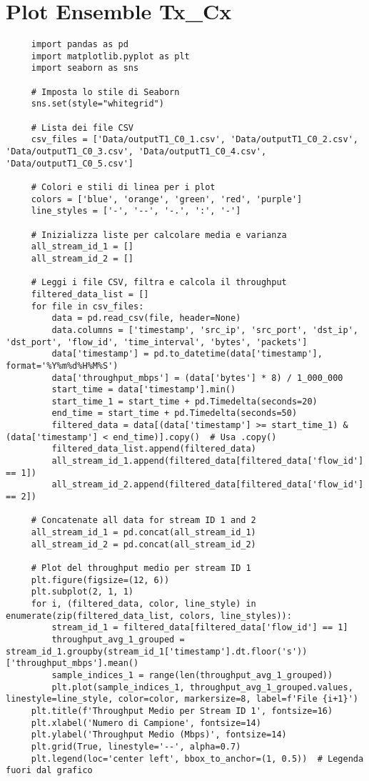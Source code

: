 \section{Plot Ensemble Tx\_Cx}
\label{plot_test_spaghetti}
\begin{lstlisting}
     import pandas as pd
     import matplotlib.pyplot as plt
     import seaborn as sns
     
     # Imposta lo stile di Seaborn
     sns.set(style="whitegrid")
     
     # Lista dei file CSV
     csv_files = ['Data/outputT1_C0_1.csv', 'Data/outputT1_C0_2.csv', 'Data/outputT1_C0_3.csv', 'Data/outputT1_C0_4.csv', 'Data/outputT1_C0_5.csv']
     
     # Colori e stili di linea per i plot
     colors = ['blue', 'orange', 'green', 'red', 'purple']
     line_styles = ['-', '--', '-.', ':', '-']
     
     # Inizializza liste per calcolare media e varianza
     all_stream_id_1 = []
     all_stream_id_2 = []
     
     # Leggi i file CSV, filtra e calcola il throughput
     filtered_data_list = []
     for file in csv_files:
         data = pd.read_csv(file, header=None)
         data.columns = ['timestamp', 'src_ip', 'src_port', 'dst_ip', 'dst_port', 'flow_id', 'time_interval', 'bytes', 'packets']
         data['timestamp'] = pd.to_datetime(data['timestamp'], format='%Y%m%d%H%M%S')
         data['throughput_mbps'] = (data['bytes'] * 8) / 1_000_000
         start_time = data['timestamp'].min()
         start_time_1 = start_time + pd.Timedelta(seconds=20)
         end_time = start_time + pd.Timedelta(seconds=50)
         filtered_data = data[(data['timestamp'] >= start_time_1) & (data['timestamp'] < end_time)].copy()  # Usa .copy()
         filtered_data_list.append(filtered_data)
         all_stream_id_1.append(filtered_data[filtered_data['flow_id'] == 1])
         all_stream_id_2.append(filtered_data[filtered_data['flow_id'] == 2])
     
     # Concatenate all data for stream ID 1 and 2
     all_stream_id_1 = pd.concat(all_stream_id_1)
     all_stream_id_2 = pd.concat(all_stream_id_2)
     
     # Plot del throughput medio per stream ID 1
     plt.figure(figsize=(12, 6))
     plt.subplot(2, 1, 1)
     for i, (filtered_data, color, line_style) in enumerate(zip(filtered_data_list, colors, line_styles)):
         stream_id_1 = filtered_data[filtered_data['flow_id'] == 1]
         throughput_avg_1_grouped = stream_id_1.groupby(stream_id_1['timestamp'].dt.floor('s'))['throughput_mbps'].mean()
         sample_indices_1 = range(len(throughput_avg_1_grouped))
         plt.plot(sample_indices_1, throughput_avg_1_grouped.values, linestyle=line_style, color=color, markersize=8, label=f'File {i+1}')
     plt.title(f'Throughput Medio per Stream ID 1', fontsize=16)
     plt.xlabel('Numero di Campione', fontsize=14)
     plt.ylabel('Throughput Medio (Mbps)', fontsize=14)
     plt.grid(True, linestyle='--', alpha=0.7)
     plt.legend(loc='center left', bbox_to_anchor=(1, 0.5))  # Legenda fuori dal grafico
     

\end{lstlisting}
